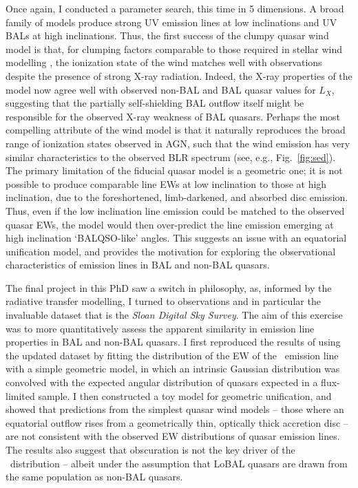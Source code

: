 Once again, I conducted a parameter search, this time in 5 dimensions. 
A broad family of models produce strong UV emission lines at low inclinations
and UV BALs at high inclinations. 
Thus, the first success of the clumpy quasar wind model is that,
for clumping factors comparable to those required 
in stellar wind modelling \citep{hamann2008}, the ionization
state of the wind matches well with observations despite the presence
of strong X-ray radiation. Indeed, the X-ray properties of the model now 
agree well with observed non-BAL and BAL quasar values for $L_X$, suggesting
that the partially self-shielding BAL outflow itself might be responsible 
for the observed X-ray weakness of BAL quasars. Perhaps the most
compelling attribute of the wind model is that it naturally reproduces
the broad range of ionization states observed in AGN, such that the wind 
emission has very similar characteristics to the observed BLR spectrum 
(see, e.g., Fig.~\ref{fig:sed}). The primary limitation of the fiducial
quasar model is a geometric one; it is not possible to produce comparable
line EWs at low inclination to those at high inclination, due to the
foreshortened, limb-darkened, and absorbed disc emission. Thus, even 
if the low inclination line emission could be matched to the observed quasar EWs,
the model would then over-predict the line emission emerging at high inclination
`BALQSO-like' angles. This suggests an issue with an equatorial unification model,
and provides the motivation for exploring the observational
characteristics of emission lines in BAL and non-BAL quasars.

The final project in this PhD saw a switch in philosophy, as, informed
by the radiative transfer modelling, I turned to observations and in particular
the invaluable dataset that is the {\sl Sloan Digital Sky Survey}. 
The aim of this exercise was to more quantitatively assess the apparent
similarity in emission line properties in BAL and non-BAL quasars. I first
reproduced the results of \cite{risaliti2011} using the updated dataset 
by fitting the distribution of the EW of the \oiiifull\ emission line 
with a simple geometric model, in which an intrinsic Gaussian distribution
was convolved with the expected angular distribution of quasars expected in a 
flux-limited sample. I then constructed a toy model for geometric unification,
and showed that predictions from the simplest quasar wind models -- 
those where an equatorial outflow rises from a geometrically thin, 
optically thick accretion disc -- are not consistent with the observed 
EW distributions of quasar emission lines. The results also suggest that
obscuration is not the key driver of the \ewo\ distribution -- albeit
under the assumption that LoBAL
quasars are drawn from the same population as non-BAL quasars.

